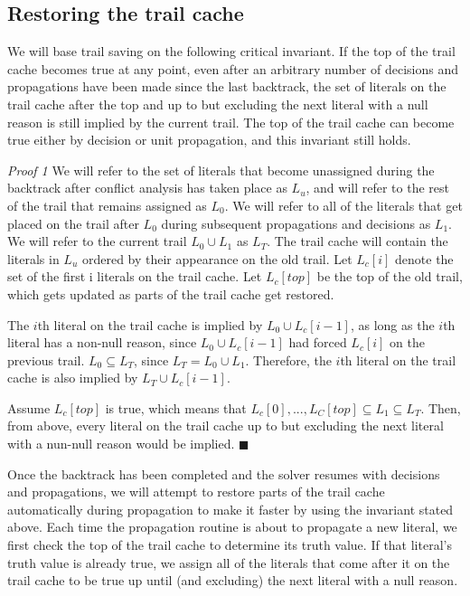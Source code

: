 \documentclass{article}
\begin{document}
\subsection{Restoring the trail cache}
We will base trail saving on the following critical invariant. If the top of the trail cache becomes true at any point, even after an arbitrary number of decisions and propagations have been made since the last backtrack, the set of literals on the trail cache after the top and up to but excluding the next literal with a null reason is still implied by the current trail. The top of the trail cache can become true either by decision or unit propagation, and this invariant still holds.\newline

\textit{Proof 1} We will refer to the set of literals that become unassigned during the backtrack after conflict analysis has taken place as $L_u$, and will refer to the rest of the trail that remains assigned as $L_0$. We will refer to all of the literals that get placed on the trail after $L_0$ during subsequent propagations and decisions as $L_1$. We will refer to the current trail $L_0 \cup L_1$ as $L_T$. The trail cache will contain the literals in $L_u$ ordered by their appearance on the old trail. Let $L_c[i]$ denote the set of the first i literals on the trail cache. Let $L_c[top]$ be the top of the old trail, which gets updated as parts of the trail cache get restored.

The $i$th literal on the trail cache is implied by $L_0 \cup L_c[i-1]$, as long as the $i$th literal has a non-null reason, since $L_0 \cup L_c[i-1]$ had forced $L_c[i]$ on the previous trail. $L_0 \subseteq L_T$, since $L_T = L_0 \cup L_1$. Therefore, the $i$th literal on the trail cache is also implied by $L_T \cup L_c[i-1]$.

Assume $L_c[top]$ is true, which means that $L_c[0], ..., L_C[top] \subseteq L_1 \subseteq L_T$. Then, from above, every literal on the trail cache up to but excluding the next literal with a nun-null reason would be implied. $\blacksquare$\newline

Once the backtrack has been completed and the solver resumes with decisions and propagations, we will attempt to restore parts of the trail cache automatically during propagation to make it faster by using the invariant stated above. Each time the propagation routine is about to propagate a new literal, we first check the top of the trail cache to determine its truth value. If that literal's truth value is already true, we assign all of the literals that come after it on the trail cache to be true up until (and excluding) the next literal with a null reason. 
\end{document}
